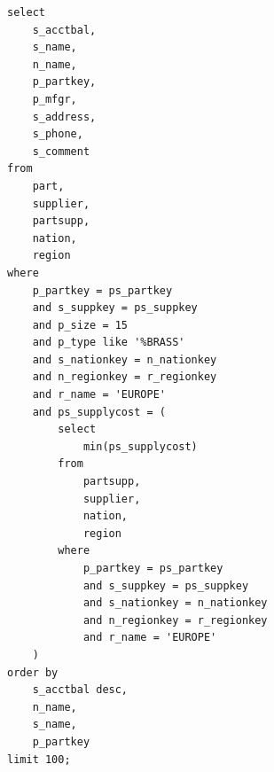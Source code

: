 \documentclass[a4paper,12pt]{scrreprt}
\begin{document}
\begin{lstlisting}
select
    s_acctbal,
    s_name,
    n_name,
    p_partkey,
    p_mfgr,
    s_address,
    s_phone,
    s_comment
from
    part,
    supplier,
    partsupp,
    nation,
    region
where
    p_partkey = ps_partkey
    and s_suppkey = ps_suppkey
    and p_size = 15
    and p_type like '%BRASS'
    and s_nationkey = n_nationkey
    and n_regionkey = r_regionkey
    and r_name = 'EUROPE'
    and ps_supplycost = (
        select
            min(ps_supplycost)
        from
            partsupp,
            supplier,
            nation,
            region
        where
            p_partkey = ps_partkey
            and s_suppkey = ps_suppkey
            and s_nationkey = n_nationkey
            and n_regionkey = r_regionkey
            and r_name = 'EUROPE'
    )
order by
    s_acctbal desc,
    n_name,
    s_name,
    p_partkey
limit 100;
\end{lstlisting}
\end{document}
